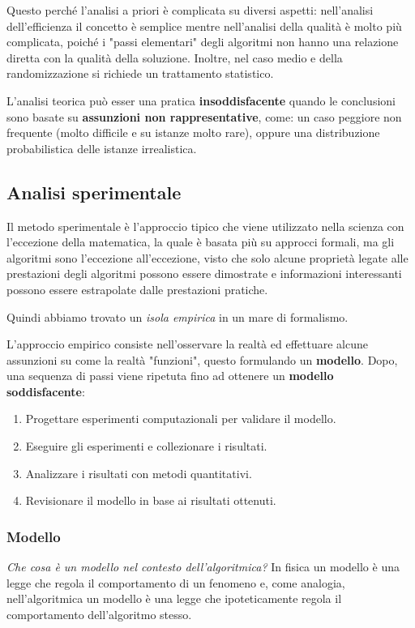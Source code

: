 \documentclass{article}
\begin{document}
Questo perché l'analisi a priori è complicata su diversi aspetti: nell'analisi dell'efficienza
il concetto è semplice mentre nell'analisi della qualità è molto più complicata,
poiché i "passi elementari" degli algoritmi non hanno una relazione diretta
con la qualità della soluzione. Inoltre, nel caso medio e della randomizzazione si richiede
un trattamento statistico.

L'analisi teorica può esser una pratica \textbf{insoddisfacente} quando le conclusioni sono basate
su \textbf{assunzioni non rappresentative}, come: un caso peggiore non frequente (molto difficile e
su istanze molto rare), oppure una distribuzione probabilistica delle istanze irrealistica.

\subsection{Analisi sperimentale}
Il metodo sperimentale è l'approccio tipico che viene utilizzato nella scienza con l'eccezione
della matematica, la quale è basata più su approcci formali, ma gli algoritmi sono l'eccezione
all'eccezione, visto che solo alcune proprietà legate alle prestazioni degli algoritmi possono
essere dimostrate e informazioni interessanti possono essere estrapolate dalle prestazioni pratiche.

Quindi abbiamo trovato un \textit{isola empirica} in un mare di formalismo.

L'approccio empirico consiste nell'osservare la realtà ed effettuare alcune assunzioni su come
la realtà "funzioni", questo formulando un \textbf{modello}. Dopo, una sequenza di passi
viene ripetuta fino ad ottenere un \textbf{modello soddisfacente}:

\begin{enumerate}
    \item Progettare esperimenti computazionali per validare il modello.
    \item Eseguire gli esperimenti e collezionare i risultati.
    \item Analizzare i risultati con metodi quantitativi.
    \item Revisionare il modello in base ai risultati ottenuti.
\end{enumerate}

\subsubsection{Modello}
\textit{Che cosa è un modello nel contesto dell'algoritmica?} In fisica un modello è una
legge che regola il comportamento di un fenomeno e, come analogia, nell'algoritmica
un modello è una legge che ipoteticamente regola il comportamento dell'algoritmo stesso.
\end{document}
